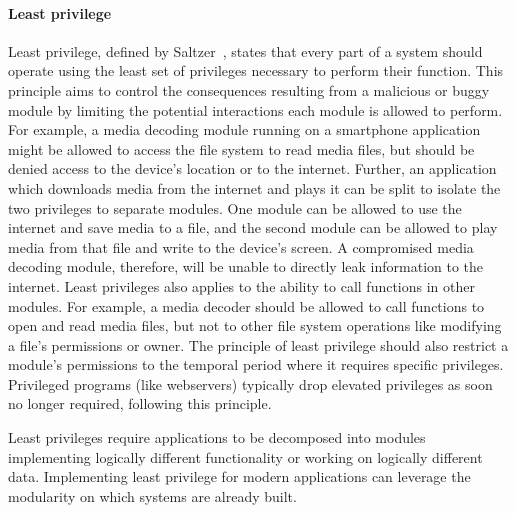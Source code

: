 \paragraph{Least privilege}
Least privilege, defined by Saltzer~\cite{SaltzerS75}, states that every
part of a system should operate using the least set of privileges necessary
to perform their function.
This principle aims to control the consequences resulting from a malicious or
buggy module by limiting the potential interactions each module is allowed
to perform.
For example, a media decoding module running on a smartphone application
might be allowed to access the file system to read media files, but should be
denied access to the device's location or to the internet.
Further, an application which downloads media from the internet and plays
it can be split to isolate the two privileges to separate modules.
One module can be allowed to use the internet and save media to a file, and
the second module can be allowed to play media from that file and write to
the device's screen.
A compromised media decoding module, therefore, will be unable to directly
leak information to the internet.
Least privileges also applies to the ability to call functions in
other modules.
For example, a media decoder should be allowed to call functions to open
and read media files, but not to other file system operations like
modifying a file's permissions or owner.
The principle of least privilege should also restrict a module's permissions
to the temporal period where it requires specific privileges.
Privileged programs (like webservers) typically drop elevated privileges 
as soon no longer required, following this principle.

Least privileges require applications to be decomposed into modules 
implementing logically different functionality or working on logically
different data.
Implementing least privilege for modern applications can leverage the
modularity on which systems are already built.

